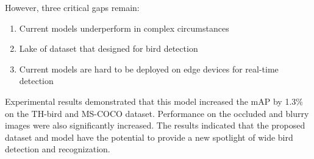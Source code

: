 However, three critical gaps remain:
\begin{enumerate}
    \item Current models underperform in complex circumstances 
    \item Lake of dataset that designed for bird detection
    \item Current models are hard to be deployed on edge devices for real-time detection
\end{enumerate}

Experimental results demonstrated that this model increased the mAP by 
1.3\% on the TH-bird and MS-COCO dataset. Performance on the occluded 
and blurry images were also significantly increased. The results indicated 
that the proposed dataset and model have the potential to provide a new spotlight
of wide bird detection and recognization. 
